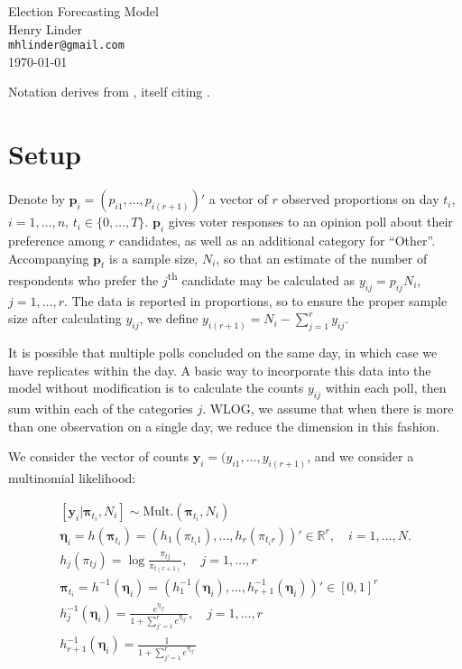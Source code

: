 \documentclass{article}
\title{}
\author{Henry Linder \\ \texttt{mhlinder@gmail.com}}
\date{\today}
\begin{document}
{
  \centering
  \Large Election Forecasting Model \\[1em]
  \normalsize Henry Linder \\
  \texttt{mhlinder@gmail.com} \\
  \today \\[2em]
  \par
}

Notation derives from \cite{cargnoni1997bayesian}, itself citing
\cite{west1997}.

\section{Setup}

Denote by $\mathbf{p}_{i}=(p_{i1}, \dots,p_{i(r+1)})'$ a vector of $r$
observed proportions on day $t_{i}$, $i=1,\dots,n$,
$t_{i}\in\{0,\dots,T\}$. $\mathbf{p}_{i}$ gives voter responses to an
opinion poll about their preference among $r$ candidates, as well as
an additional category for ``Other''. Accompanying $\mathbf{p}_{t}$ is
a sample size, $N_{i}$, so that an estimate of the number of
respondents who prefer the $j$\textsuperscript{th} candidate may be
calculated as $y_{ij}=p_{ij}N_{i}$, $j=1,\dots,r$. The data is
reported in proportions, so to ensure the proper sample size after
calculating $y_{ij}$, we define $y_{i(r+1)} = N_{i} -
\sum_{j=1}^{r}y_{ij}$.

It is possible that multiple polls concluded on the same day, in which
case we have replicates within the day. A basic way to incorporate
this data into the model without modification is to calculate the
counts $y_{ij}$ within each poll, then sum within each of the
categories $j$. WLOG, we assume that when there is more than one
observation on a single day, we reduce the dimension in this fashion.

We consider the vector of counts
$\mathbf{y}_{i}=(y_{i1},\dots,y_{i(r+1)}$, and we consider a
multinomial likelihood:

\begin{gather}
  \left[ \mathbf{y}_{i}|\bm\pi_{t_{i}}, N_{i} \right]\sim
  \text{Mult.}(\bm\pi_{t_{i}}, N_{i}) \\
  \bm\eta_{i} = h(\bm\pi_{t_{i}}) = (h_{1}(\pi_{t_{i}1}), \dots,
  h_{r}(\pi_{t_{i}r}))'\in\mathbb{R}^{r}, \quad i=1,\dots, N. \\
  h_{j}(\pi_{tj}) = \log\frac{\pi_{tj}}{\pi_{t(r+1)}}, \quad
  j=1,\dots, r \\
  \bm\pi_{t_{i}} = h^{-1}(\bm\eta_{i}) = (h_{1}^{-1}(\bm\eta_{i}), \dots,
  h_{r+1}^{-1}(\bm\eta_{i}))' \in [0,1]^{r} \\
  h_{j}^{-1}(\bm\eta_{i}) =
  \frac{e^{\eta_{ij}}}{1+\sum_{j'=1}^{r}e^{\eta_{ij'}}}, \quad
  j=1,\dots, r\\
  h_{r+1}^{-1}(\bm\eta_{i}) = \frac{1}{1+\sum_{j'=1}^{r}e^{\eta_{ij'}}}
\end{gather}
\end{document}
